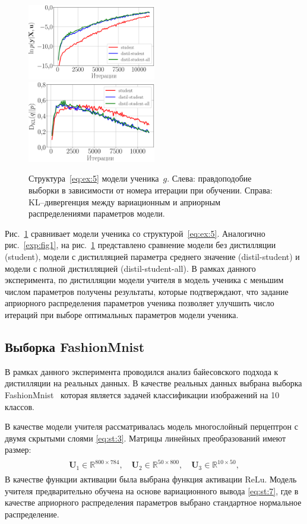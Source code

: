 \documentclass[12pt]{a&t}
\begin{document}
\begin{figure}[h!]
\includegraphics[width=0.5\textwidth]{synthetic_likelihood_2_layers.eps}
\includegraphics[width=0.5\textwidth]{synthetic_D_KL_2_layers.eps}
\caption{Структура~\eqref{eq:ex:5} модели ученика~$g$. Слева: правдоподобие выборки в зависимости от номера итерации при обучении. Справа: KL--дивергенция между вариационным и априорным распределениями параметров модели.}
\label{exp:fig2}
\end{figure}

Рис.~\ref{exp:fig2} сравнивает модели ученика со структурой~\eqref{eq:ex:5}. Аналогично рис.~\ref{exp:fig1}, на рис.~\ref{exp:fig2} представлено сравнение модели без дистилляции (student), модели с дистилляцией параметра среднего значение (distil-student) и модели с полной дистилляцией (distil-student-all). В рамках данного эксперимента, по дистилляции модели учителя в модель ученика с меньшим числом параметров получены результаты, которые подтверждают, что задание априорного распределения параметров ученика позволяет улучшить число итераций при выборе оптимальных параметров модели ученика.

\subsection{Выборка FashionMnist}

В рамках данного эксперимента проводился анализ байесовского подхода к дистилляции на реальных данных.  В качестве реальных данных выбрана выборка FashionMnist~\cite{fashionmnist} которая является задачей классификации изображений на 10 классов.

В качестве модели учителя рассматривалась модель многослойный перцептрон с двумя скрытыми слоями \eqref{eq:st:3}. Матрицы линейных преобразований имеют размер:
\begin{gather}
\label{eq:ex:7}
\begin{aligned}
\mathbf{U}_{1} \in \mathbb{R}^{800 \times 784}, \quad \mathbf{U}_{2} \in \mathbb{R}^{50 \times 800}, \quad \mathbf{U}_{3} \in \mathbb{R}^{10 \times 50},
\end{aligned}
\end{gather}
В качестве функции активации была выбрана функция активации $\text{ReLu}$.
Модель учителя предварительно обучена на основе вариационного вывода \eqref{eq:st:7}, где в качестве априорного распределения параметров выбрано стандартное нормальное распределение.
\end{document}
